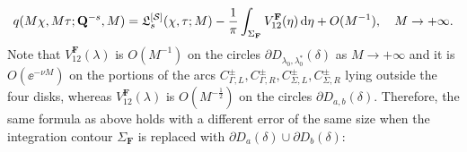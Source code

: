 \begin{equation}
q(M\chi, M\tau; \mathbf{Q}^{-s},M) =  \mathfrak{L}_s^{[\mathcal{S}]}(\chi,\tau;M) -\frac{1}{\pi}\int_{\Sigma_\mathbf{F}} V^{\mathbf{F}}_{12}(\eta)\,\mathrm{d} \eta  + O(M^{-1}),
\quad M\to+\infty.
\end{equation}
Note that $V^\mathbf{F}_{12}(\lambda)$ is $O(M^{-1})$ on the circles $\partial D_{\lambda_0,\lambda_0^*}(\delta)$ as $M\to+\infty$ and it is  $O(\ee^{-\nu M})$ on the portions of the arcs $C^\pm_{\Gamma, L}, C^\pm_{\Gamma, R}, C^\pm_{\Sigma, L}, C^\pm_{\Sigma, R}$ lying outside the four disks, whereas $V^\mathbf{F}_{12}(\lambda)$ is $O(M^{-\frac{1}{2}})$ on the circles $\partial D_{a,b}(\delta)$. Therefore, the same formula as above holds with a different error of the same size when the integration contour $\Sigma_{\mathbf{F}}$ is replaced with $\partial D_{a}(\delta) \cup \partial D_{b}(\delta)$:
